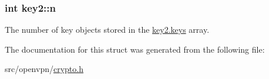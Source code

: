 \subsubsection[{n}]{\setlength{\rightskip}{0pt plus 5cm}int key2\+::n}\label{structkey2_a325d016ea0977d9569d3d75fd4e7fe06}
The number of {\ttfamily key} objects stored in the {\ttfamily \hyperlink{structkey2_a9698a633f0112a2000a0efdb8d960010}{key2.\+keys}} array. 

The documentation for this struct was generated from the following file\+:\begin{DoxyCompactItemize}
\item 
src/openvpn/\hyperlink{crypto_8h}{crypto.\+h}\end{DoxyCompactItemize}
